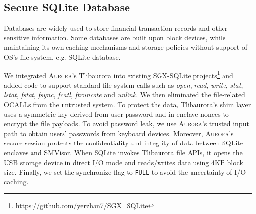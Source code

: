 %
%

\subsection{Secure SQLite Database}
Databases are widely used to store financial transaction records and other sensitive information. Some databases are built upon block devices, while maintaining its own caching mechanisms and storage policies without support of OS's file system, e.g. SQLite database.

We integrated \textsc{Aurora}'s Tlibaurora into existing SGX-SQLite projects\footnote{https://github.com/yerzhan7/SGX\_SQLite} and added code to support standard file system calls such as \textit{open}, \textit{read}, \textit{write}, \textit{stat}, \textit{lstat}, \textit{fstat}, \textit{fsync}, \textit{fcntl}, \textit{ftruncate} and \textit{unlink}. We then eliminated the file-related OCALLs from the untrusted system. 
To protect the data, Tlibaurora's shim layer uses a symmetric key derived from user password and in-enclave nonces to encrypt the file payloads. %
To avoid password leak, we use \textsc{Aurora}'s trusted input path to obtain users' passwords from keyboard devices. Moreover, \textsc{Aurora}'s secure session protects the confidentiality and integrity of data between SQLite enclaves and SMVisor.
When SQLite invokes Tlibaurora file APIs, it opens the USB storage device in direct I/O mode and reads/writes data using 4KB block size. 
Finally, %
we set the synchronize flag to \texttt{FULL} to avoid the uncertainty of I/O caching.

